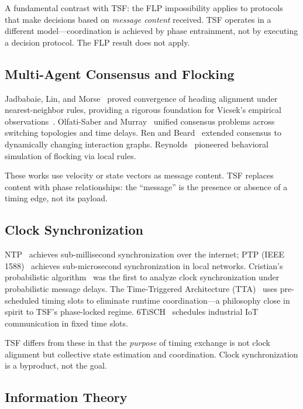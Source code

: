 \documentclass[twocolumn,10pt]{article}
\begin{document}
A fundamental contrast with TSF: the FLP impossibility applies to protocols
that make decisions based on \emph{message content} received. TSF operates
in a different model---coordination is achieved by phase entrainment, not by
executing a decision protocol. The FLP result does not apply.

\subsection{Multi-Agent Consensus and Flocking}

Jadbabaie, Lin, and Morse~\cite{Jadbabaie2003} proved convergence of heading
alignment under nearest-neighbor rules, providing a rigorous foundation for
Vicsek's empirical observations~\cite{Vicsek1995}. Olfati-Saber and
Murray~\cite{OlfatiSaber2004} unified consensus problems across switching
topologies and time delays. Ren and Beard~\cite{Ren2005} extended consensus to
dynamically changing interaction graphs. Reynolds~\cite{Reynolds1987} pioneered
behavioral simulation of flocking via local rules.

These works use velocity or state vectors as message content. TSF replaces
content with phase relationships: the ``message'' is the presence or absence
of a timing edge, not its payload.

\subsection{Clock Synchronization}

NTP~\cite{Mills1991} achieves sub-millisecond synchronization over the
internet; PTP (IEEE 1588)~\cite{IEEE1588-2019} achieves sub-microsecond
synchronization in local networks. Cristian's probabilistic
algorithm~\cite{Cristian1989} was the first to analyze clock synchronization
under probabilistic message delays. The Time-Triggered Architecture
(TTA)~\cite{Kopetz2003} uses pre-scheduled timing slots to eliminate runtime
coordination---a philosophy close in spirit to TSF's phase-locked regime.
6TiSCH~\cite{Watteyne2015} schedules industrial IoT communication in fixed
time slots.

TSF differs from these in that the \emph{purpose} of timing exchange is not
clock alignment but collective state estimation and coordination. Clock
synchronization is a byproduct, not the goal.

\subsection{Information Theory}
\end{document}
